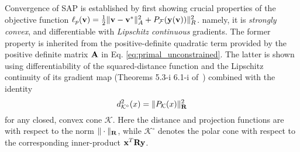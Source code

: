 \newcommand{\coneName}{\mathcal{K}}
\newcommand{\dist}{d}
\newcommand{\cond}{\text{cond}}
\newcommand{\vx}{\mf{v}}
\newcommand{\fx}{\ell_p(\mf{\vx})}

\newcommand{\vy}{\mf{u}}
\newcommand{\fy}{\ell_p(\mf{\vy})}
\newcommand{\vd}{\mf{d}}

\renewcommand\qedsymbol{$\IEEEQED$}

Convergence of SAP is established
by first showing crucial properties
of the objective function 
$\ell_p({\mathbf{v}}) = \frac{1}{2}\Vert{\mathbf{v}}-{\mathbf{v}}^*\Vert_{A}^2 + P_\mathcal{F}({\mathbf{y}}({\mathbf{v}}))\Vert_R^2$.
namely, it is  \emph{strongly convex},
and differentiable with \emph{Lipschitz continuous} gradients.  The
former property is inherited from the positive-definite quadratic term 
provided by the positive definite matrix ${\mathbf{A}}$ in Eq. \eqref{eq:primal_unconstrained}.  The latter is shown using differentiability of the squared-distance function
 and the Lipschitz continuity of its gradient map (Theorems 5.3-i 6.1-i of~\cite{bib:delfour2011shapes})
 combined with the identity
\[
  \dist^2_{\coneName^\circ}(x) = \|P_{\coneName}(x)\|_{\mf{R}}^2
\] 
for any closed, convex cone $\coneName$. Here 
the distance and projection functions are with respect to the
norm $\|\cdot\|_{\mathbf{R}}$, while $\coneName^\circ$ denotes the polar
cone with respect to the corresponding inner-product ${\mathbf{x}}^T {\mathbf{R}} {\mathbf{y}}$.

